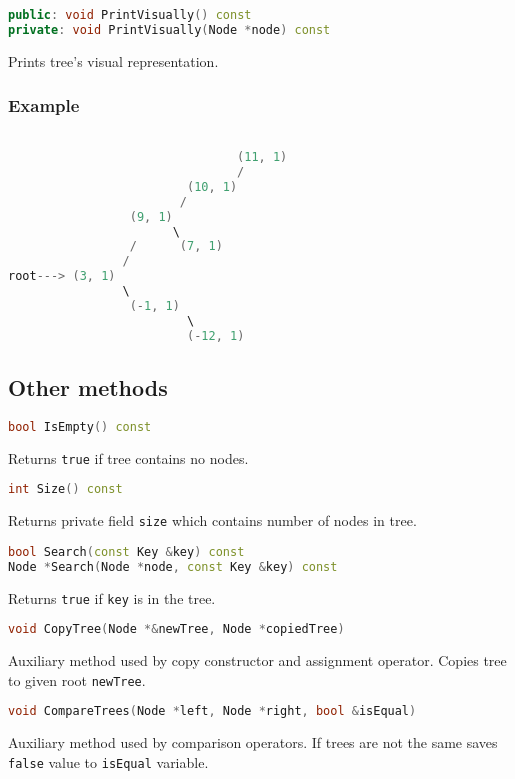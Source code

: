 \documentclass{article}
\begin{document}
\begin{lstlisting}[language=C++]
public: void PrintVisually() const
private: void PrintVisually(Node *node) const
\end{lstlisting}
Prints tree's visual representation.

\subsubsection*{Example}
\begin{lstlisting}[language=C++]

                                (11, 1)
                                /
                         (10, 1)
                        /
                 (9, 1)
                       \
                 /      (7, 1)
                /
root---> (3, 1)
                \
                 (-1, 1)
                         \
                         (-12, 1)
\end{lstlisting}
\vspace{\baselineskip}

\subsection{Other methods}

\begin{lstlisting}[language=C++]
bool IsEmpty() const
\end{lstlisting}
Returns {\tt true} if tree contains no nodes.

\begin{lstlisting}[language=C++]
int Size() const
\end{lstlisting}
Returns private field {\tt size} which contains number of nodes in tree.

\begin{lstlisting}[language=C++]
bool Search(const Key &key) const
Node *Search(Node *node, const Key &key) const
\end{lstlisting}
Returns {\tt true} if {\tt key} is in the tree.

\begin{lstlisting}[language=C++]
void CopyTree(Node *&newTree, Node *copiedTree)
\end{lstlisting}
Auxiliary method used by copy constructor and assignment operator. Copies tree to given
root {\tt newTree}.

\begin{lstlisting}[language=C++]
void CompareTrees(Node *left, Node *right, bool &isEqual)
\end{lstlisting}
Auxiliary method used by comparison operators. If trees are not the same saves {\tt false}
value to {\tt isEqual} variable.
\end{document}
